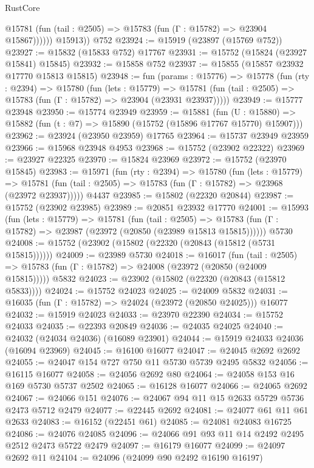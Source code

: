 \begin{lexlean}{RustCore}
\begin{coremodule}
              @15781 (fun (tail : @2505) => @15783 (fun (Γ : @15782) => @23904 @15867))))))
        @15913))
    @752
@23924 := @15919 (@23897 (@15769 @752))
@23927 := @15832 (@15833 @752) @17767
@23931 := @15752 (@15824 (@23927 @15841) @15845)
@23932 := @15858 @752
@23937 := @15855 (@15857 @23932 @17770 @15813 @15815)
@23948 := fun (params : @15776) =>
  @15778
    (fun (rty : @2394) =>
    @15780
      (fun (lets : @15779) =>
      @15781 (fun (tail : @2505) => @15783 (fun (Γ : @15782) => @23904 (@23931 @23937)))))
@23949 := @15777 @23948
@23950 := @15774 @23949
@23959 := @15881
    (fun (U : @15880) => @15882 (fun (t : @7) => @15890 (@15752 (@15896 @17767 @15770) @15907)))
@23962 := @23924 (@23950 @23959) @17765
@23964 := @15737 @23949 @23959
@23966 := @15968 @23948 @4953
@23968 := @15752 (@23902 @22322)
@23969 := @23927 @22325
@23970 := @15824 @23969
@23972 := @15752 (@23970 @15845)
@23983 := @15971
    (fun (rty : @2394) =>
    @15780
      (fun (lets : @15779) =>
      @15781 (fun (tail : @2505) => @15783 (fun (Γ : @15782) => @23968 (@23972 @23937)))))
    @4437
@23985 := @15802 (@22320 @20844)
@23987 := @15752 (@23902 @23985)
@23989 := @20851 @23932 @17770
@24001 := @15993
    (fun (lets : @15779) =>
    @15781
      (fun (tail : @2505) =>
      @15783 (fun (Γ : @15782) => @23987 (@23972 (@20850 (@23989 @15813 @15815))))))
    @5730
@24008 := @15752 (@23902 (@15802 (@22320 (@20843 (@15812 (@5731 @15815))))))
@24009 := @23989 @5730
@24018 := @16017
    (fun (tail : @2505) => @15783 (fun (Γ : @15782) => @24008 (@23972 (@20850 (@24009 @15815)))))
    @5832
@24023 := @23902 (@15802 (@22320 (@20843 (@15812 @5833))))
@24024 := @15752 @24023
@24025 := @24009 @5832
@24031 := @16035 (fun (Γ : @15782) => @24024 (@23972 (@20850 @24025))) @16077
@24032 := @15919 @24023
@24033 := @23970 @22390
@24034 := @15752 @24033
@24035 := @22393 @20849
@24036 := @24035 @24025
@24040 := @24032 (@24034 @24036) (@16089 @23901)
@24044 := @15919 @24033 @24036 (@16094 @23969)
@24045 := @16100 @16077
@24047 := @24045 @2692 @2692
@24055 := @24047 @154 @727 @750 @11 @5730 @5739 @2495 @5832
@24056 := @16115 @16077
@24058 := @24056 @2692 @80
@24064 := @24058 @153 @16 @169 @5730 @5737 @2502
@24065 := @16128 @16077
@24066 := @24065 @2692
@24067 := @24066 @151
@24076 := @24067 @94 @11 @15 @2633 @5729 @5736 @2473 @5712 @2479
@24077 := @22445 @2692
@24081 := @24077 @61 @11 @61 @2633
@24083 := @16152 (@22451 @61)
@24085 := @24081 @24083 @16725
@24086 := @24076 @24085
@24096 := @24066 @91 @93 @11 @14 @2492 @2495 @2512 @2473 @5722 @2479
@24097 := @16179 @16077
@24099 := @24097 @2692 @11
@24104 := @24096 (@24099 @90 @2492 @16190 @16197)

\end{coremodule}
\end{lexlean}
